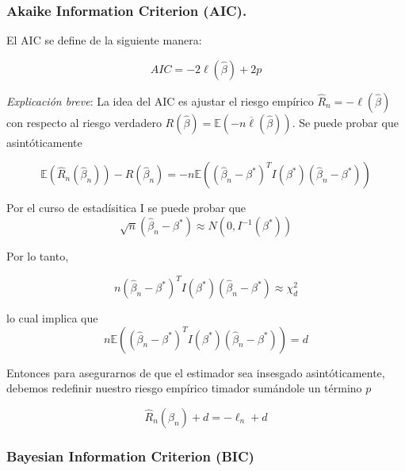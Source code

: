 \documentclass[
  12pt,
]{book}
\begin{document}
\hypertarget{akaike-information-criterion-aic.}{%
\subsubsection{Akaike Information Criterion
(AIC).}\label{akaike-information-criterion-aic.}}

El AIC se define de la siguiente manera:

\[
AIC = -2\ell(\hat{\beta}) + 2p 
\]

\emph{Explicación breve}: La idea del AIC es ajustar el riesgo empírico
\(\hat{R}_n = -\ell(\hat{\beta})\) con respecto al riesgo verdadero
\(R(\hat{\beta}) = \mathbb{E}(-n\overline{\ell}(\hat{\beta}))\). Se
puede probar que asintóticamente

\begin{equation*}
\mathbb{E}\left(\widehat{R}_{n}\left(\hat{\beta}_{n}\right)\right)-R\left(\widehat{\beta}_{n}\right)=-n \mathbb{E}\left(\left(\widehat{\beta}_{n}-\beta^{*}\right)^{T} I\left(\beta^{*}\right)\left(\widehat{\beta}_{n}-\beta^{*}\right)\right)
\end{equation*}

Por el curso de estadísitica I se puede probar que \begin{equation*}
\sqrt{n}\left(\hat{\beta}_{n}-\beta^{*}\right) \approx N\left(0, I^{-1}\left(\beta^{*}\right)\right)
\end{equation*}

Por lo tanto,

\begin{equation*}
n\left(\widehat{\beta}_{n}-\beta^{*}\right)^{T} I\left(\beta^{*}\right)\left(\widehat{\beta}_{n}-\beta^{*}\right) \approx \chi_{d}^{2}
\end{equation*}

lo cual implica que \begin{equation*}
n \mathbb{E}\left(\left(\widehat{\beta}_{n}-\beta^{*}\right)^{T} I\left(\beta^{*}\right)\left(\widehat{\beta}_{n}-\beta^{*}\right)\right)=d
\end{equation*}

Entonces para asegurarnos de que el estimador sea insesgado
asintóticamente, debemos redefinir nuestro riesgo empírico timador
sumándole un término \(p\)

\[\widehat{R}_{n}\left(\widehat{\beta}_{n}\right)+d=-\ell_{n}+d\]

\hypertarget{bayesian-information-criterion-bic}{%
\subsubsection{Bayesian Information Criterion
(BIC)}\label{bayesian-information-criterion-bic}}
\end{document}
